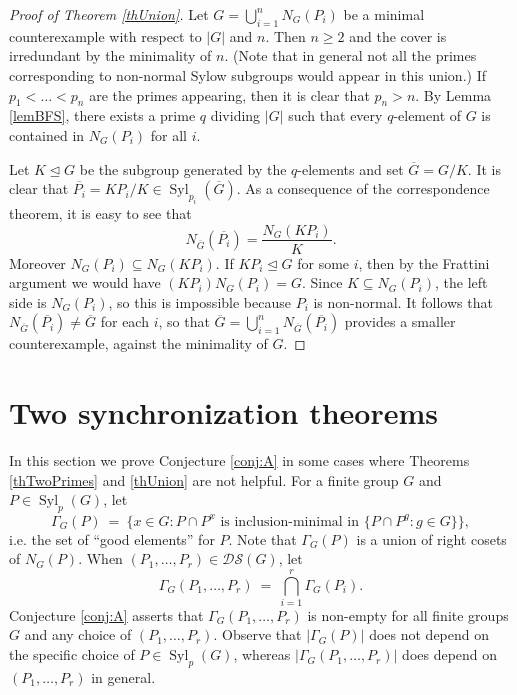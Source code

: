 \documentclass[11pt]{amsart}
\numberwithin{equation}{section}
\theoremstyle{definition}
\theoremstyle{remark}
\newcommand{\Syl}{\mathop{\mathrm{Syl}}}
\newcommand{\DS}{\mathcal{DS}}
\begin{document}
\begin{proof}[Proof of Theorem \ref{thUnion}]
Let $G = \bigcup_{i=1}^n N_G(P_i)$ be a minimal counterexample with respect to $|G|$ and $n$.
Then $n \geq 2$ and the cover is irredundant by the minimality of $n$.
(Note that in general not all the primes corresponding to non-normal Sylow subgroups would appear in this union.)
If $p_1 < \ldots <p_n$ are the primes appearing, then it is clear that $p_n>n$.
By Lemma \ref{lemBFS}, there exists a prime $q$ dividing $|G|$
such that every $q$-element of $G$ is contained in $N_G(P_i)$ for all $i$.

Let $K \unlhd G$ be the subgroup generated by the $q$-elements and set $\overline{G} = G/K$.
It is clear that $\overline{P_i} = KP_i/K \in \Syl_{p_i}(\overline{G})$.
As a consequence of the correspondence theorem, it is easy to see that
$$ N_{\overline{G}}(\overline{P_i}) = \frac{N_G(KP_i)}{K} . $$
Moreover $N_G(P_i) \subseteq N_G(KP_i)$.
If $KP_i \unlhd G$ for some $i$, then
by the Frattini argument we would have $(K P_i) N_G(P_i) = G$.
Since $K \subseteq N_G(P_i)$, the left side is $N_G(P_i)$, so this is impossible because $P_i$ is non-normal.
It follows that $N_{\overline{G}}(\overline{P_i}) \neq \overline{G}$ for each $i$,
so that $\overline{G} = \bigcup_{i=1}^n N_{\overline{G}}(\overline{P_i})$ provides a smaller counterexample,
against the minimality of $G$.
\end{proof} 







\vspace{0.1cm}
\section{Two synchronization theorems} \label{sec4} 

In this section we prove Conjecture \ref{conj:A} in some cases
where Theorems \ref{thTwoPrimes} and \ref{thUnion} are not helpful.
For a finite group $G$ and $P \in \Syl_p(G)$, let
$$ \Gamma_G(P) \> = \> \{ x \in G : P \cap P^x \mbox{ is inclusion-minimal in } \{ P \cap P^g : g \in G \} \} , $$
i.e. the set of ``good elements'' for $P$.
Note that $\Gamma_G(P)$ is a union of right cosets of $N_G(P)$.
When $(P_1,\ldots,P_r) \in \DS(G)$, let
$$ \Gamma_G(P_1,\ldots,P_r) \> = \> \bigcap_{i=1}^r \Gamma_G(P_i) . $$
Conjecture \ref{conj:A} asserts that $\Gamma_G(P_1,\ldots,P_r)$ is non-empty for all finite groups $G$
and any choice of $(P_1,\ldots,P_r)$.
Observe that $|\Gamma_G(P)|$ does not depend on the specific choice of $P \in \Syl_p(G)$,
whereas $|\Gamma_G(P_1,\ldots,P_r)|$ does depend on $(P_1,\ldots,P_r)$ in general.
\end{document}
